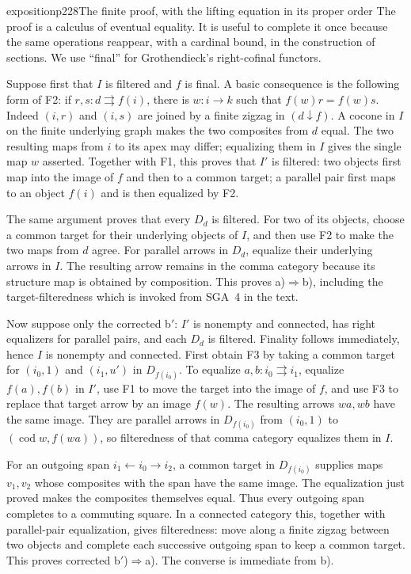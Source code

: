 \begin{dcomment}{exposition}{p228}{The finite proof, with the lifting equation in its proper order}
The proof is a calculus of eventual equality.  It is useful to complete it once because the same operations reappear, with a cardinal bound, in the construction of sections.  We use ``final'' for Grothendieck's right-cofinal functors.

Suppose first that $I$ is filtered and $f$ is final.  A basic consequence is the following form of F2: if $r,s:d\rightrightarrows f(i)$, there is $w:i\to k$ such that $f(w)r=f(w)s$.  Indeed $(i,r)$ and $(i,s)$ are joined by a finite zigzag in $(d\downarrow f)$.  A cocone in $I$ on the finite underlying graph makes the two composites from $d$ equal.  The two resulting maps from $i$ to its apex may differ; equalizing them in $I$ gives the single map $w$ asserted.  Together with F1, this proves that $I'$ is filtered: two objects first map into the image of $f$ and then to a common target; a parallel pair first maps to an object $f(i)$ and is then equalized by F2.

The same argument proves that every $D_d$ is filtered.  For two of its objects, choose a common target for their underlying objects of $I$, and then use F2 to make the two maps from $d$ agree.  For parallel arrows in $D_d$, equalize their underlying arrows in $I$.  The resulting arrow remains in the comma category because its structure map is obtained by composition.  This proves a)$\Rightarrow$b), including the target-filteredness which is invoked from SGA~4 in the text.

Now suppose only the corrected b$'$: $I'$ is nonempty and connected, has right equalizers for parallel pairs, and each $D_d$ is filtered.  Finality follows immediately, hence $I$ is nonempty and connected.  First obtain F3 by taking a common target for $(i_0,1)$ and $(i_1,u')$ in $D_{f(i_0)}$.  To equalize $a,b:i_0\rightrightarrows i_1$, equalize $f(a),f(b)$ in $I'$, use F1 to move the target into the image of $f$, and use F3 to replace that target arrow by an image $f(w)$.  The resulting arrows $wa,wb$ have the same image.  They are parallel arrows in $D_{f(i_0)}$ from $(i_0,1)$ to $(\operatorname{cod}w,f(wa))$, so filteredness of that comma category equalizes them in $I$.

For an outgoing span $i_1\leftarrow i_0\to i_2$, a common target in $D_{f(i_0)}$ supplies maps $v_1,v_2$ whose composites with the span have the same image.  The equalization just proved makes the composites themselves equal.  Thus every outgoing span completes to a commuting square.  In a connected category this, together with parallel-pair equalization, gives filteredness: move along a finite zigzag between two objects and complete each successive outgoing span to keep a common target.  This proves corrected b$'$)$\Rightarrow$a).  The converse is immediate from b).


\end{dcomment}
